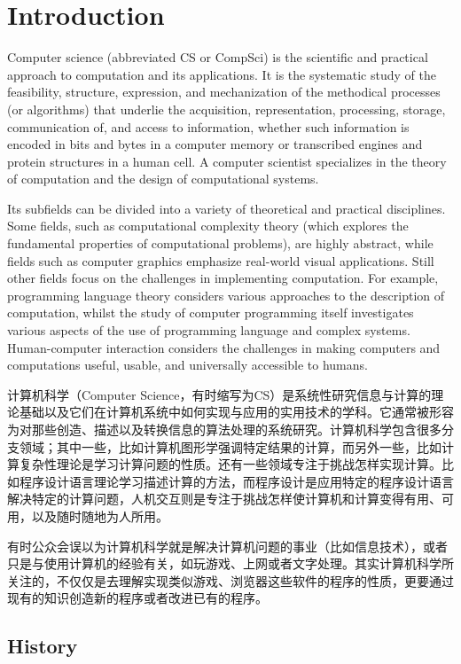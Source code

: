 \part{Introduction}

Computer science (abbreviated CS or CompSci) is the scientific and practical approach to computation and its applications. It is the systematic study of the feasibility, structure, expression, and mechanization of the methodical processes (or algorithms) that underlie the acquisition, representation, processing, storage, communication of, and access to information, whether such information is encoded in bits and bytes in a computer memory or transcribed engines and protein structures in a human cell. A computer scientist specializes in the theory of computation and the design of computational systems.

Its subfields can be divided into a variety of theoretical and practical disciplines. Some fields, such as computational complexity theory (which explores the fundamental properties of computational problems), are highly abstract, while fields such as computer graphics emphasize real-world visual applications. Still other fields focus on the challenges in implementing computation. For example, programming language theory considers various approaches to the description of computation, whilst the study of computer programming itself investigates various aspects of the use of programming language and complex systems. Human-computer interaction considers the challenges in making computers and computations useful, usable, and universally accessible to humans.

计算机科学（Computer Science，有时缩写为CS）是系统性研究信息与计算的理论基础以及它们在计算机系统中如何实现与应用的实用技术的学科。它通常被形容为对那些创造、描述以及转换信息的算法处理的系统研究。计算机科学包含很多分支领域；其中一些，比如计算机图形学强调特定结果的计算，而另外一些，比如计算复杂性理论是学习计算问题的性质。还有一些领域专注于挑战怎样实现计算。比如程序设计语言理论学习描述计算的方法，而程序设计是应用特定的程序设计语言解决特定的计算问题，人机交互则是专注于挑战怎样使计算机和计算变得有用、可用，以及随时随地为人所用。

有时公众会误以为计算机科学就是解决计算机问题的事业（比如信息技术），或者只是与使用计算机的经验有关，如玩游戏、上网或者文字处理。其实计算机科学所关注的，不仅仅是去理解实现类似游戏、浏览器这些软件的程序的性质，更要通过现有的知识创造新的程序或者改进已有的程序。

\chapter{History}


